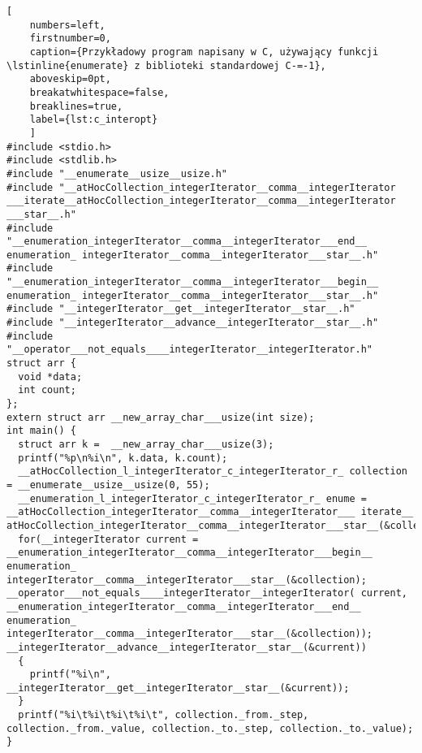 \begin{minipage}{\linewidth}
  
  \begin{lstlisting}[
    numbers=left,
    firstnumber=0,
    caption={Przykładowy program napisany w C, używający funkcji \lstinline{enumerate} z biblioteki standardowej C-=-1},
    aboveskip=0pt,
    breakatwhitespace=false,
    breaklines=true,
    label={lst:c_interopt}
    ]
#include <stdio.h>
#include <stdlib.h>
#include "__enumerate__usize__usize.h"
#include "__atHocCollection_integerIterator__comma__integerIterator ___iterate__atHocCollection_integerIterator__comma__integerIterator ___star__.h"
#include "__enumeration_integerIterator__comma__integerIterator___end__ enumeration_ integerIterator__comma__integerIterator___star__.h"
#include "__enumeration_integerIterator__comma__integerIterator___begin__ enumeration_ integerIterator__comma__integerIterator___star__.h"
#include "__integerIterator__get__integerIterator__star__.h"
#include "__integerIterator__advance__integerIterator__star__.h"
#include "__operator___not_equals____integerIterator__integerIterator.h"
struct arr {
  void *data;
  int count;
};
extern struct arr __new_array_char___usize(int size);
int main() {
  struct arr k =  __new_array_char___usize(3);
  printf("%p\n%i\n", k.data, k.count);
  __atHocCollection_l_integerIterator_c_integerIterator_r_ collection = __enumerate__usize__usize(0, 55);
  __enumeration_l_integerIterator_c_integerIterator_r_ enume = __atHocCollection_integerIterator__comma__integerIterator___ iterate__ atHocCollection_integerIterator__comma__integerIterator___star__(&collection);
  for(__integerIterator current = __enumeration_integerIterator__comma__integerIterator___begin__ enumeration_ integerIterator__comma__integerIterator___star__(&collection); __operator___not_equals____integerIterator__integerIterator( current, __enumeration_integerIterator__comma__integerIterator___end__ enumeration_ integerIterator__comma__integerIterator___star__(&collection)); __integerIterator__advance__integerIterator__star__(&current))
  {
    printf("%i\n", __integerIterator__get__integerIterator__star__(&current));
  }
  printf("%i\t%i\t%i\t%i\t", collection._from._step, collection._from._value, collection._to._step, collection._to._value);
}
\end{lstlisting}
\end{minipage}
